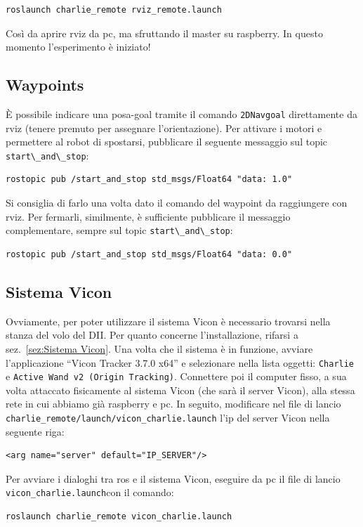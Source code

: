 \begin{lstlisting}[style=bashPC]
	roslaunch charlie_remote rviz_remote.launch
\end{lstlisting}
Così da aprire rviz da pc, ma sfruttando il master su raspberry.
In questo momento l'esperimento è iniziato!

\subsection{Waypoints}
\`E possibile indicare una posa-goal tramite il comando \texttt{2DNavgoal} direttamente da rviz (tenere premuto per assegnare l'orientazione).
Per attivare i motori e permettere al robot di spostarsi, pubblicare il seguente messaggio sul topic \verb|start\_and\_stop|:

\begin{lstlisting}[style=bash]
	rostopic pub /start_and_stop std_msgs/Float64 "data: 1.0"
\end{lstlisting}
Si consiglia di farlo una volta dato il comando del waypoint da raggiungere con rviz.
Per fermarli, similmente, è sufficiente pubblicare il messaggio complementare, sempre sul topic \verb|start\_and\_stop|:

\begin{lstlisting}[style=bash]
	rostopic pub /start_and_stop std_msgs/Float64 "data: 0.0"
\end{lstlisting}

\subsection{Sistema Vicon}
Ovviamente, per poter utilizzare il sistema Vicon è necessario trovarsi nella stanza del volo del DII. 
Per quanto concerne l'installazione, rifarsi a sez.~\ref{sez:Sistema Vicon}. 
Una volta che il sistema è in funzione, avviare l'applicazione ``Vicon Tracker 3.7.0 x64'' e selezionare nella lista oggetti: \texttt{Charlie} e 
\texttt{Active Wand v2 (Origin Tracking)}. 
Connettere poi il computer fisso, a sua volta attaccato fisicamente al sistema Vicon (che sarà il server Vicon), alla stessa rete in cui abbiamo già
raspberry e pc. In seguito, modificare nel file di lancio \texttt{charlie\_remote/launch/vicon\_charlie.launch} l'ip del server Vicon nella seguente riga:
\begin{lstlisting}[style=xml, firstnumber=6]
	<arg name="server" default="IP_SERVER"/>
\end{lstlisting}

Per avviare i dialoghi tra ros e il sistema Vicon, eseguire da pc il file di lancio \verb|vicon_charlie.launch|con il comando:
\begin{lstlisting}[style=bashPC]
	roslaunch charlie_remote vicon_charlie.launch
\end{lstlisting}

